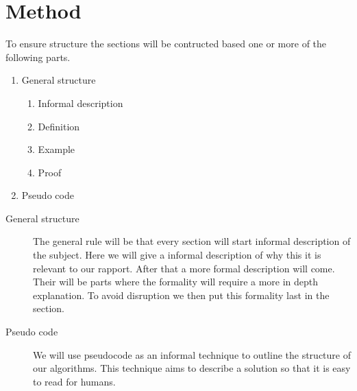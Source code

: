 \section{Method}
To ensure structure the sections will be contructed based one or more of the following parts.
\begin{enumerate}
    \item General structure 
    \begin{enumerate}
        \item Informal description
        \item Definition
        \item Example
        \item Proof    
   
    \end{enumerate}
  
    \item Pseudo code
\end{enumerate}

\begin{description}
    \item[General structure] The general rule will be that every section will start informal description of the subject. Here we will give a informal description of why this it is relevant to our rapport. After that a more formal description will come. Their will be parts where the formality will require a more in depth explanation. To avoid disruption we then put this formality last in the section. 
    
    
    \item[Pseudo code]  We will use pseudocode as an informal technique to outline the structure of our algorithms. This technique aims to describe a solution so that it is easy to read for humans.

\end{description}

